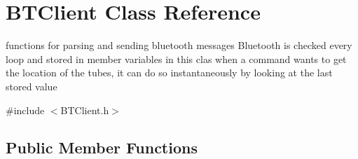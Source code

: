 \hypertarget{classBTClient}{\section{B\-T\-Client Class Reference}
\label{classBTClient}
}


functions for parsing and sending bluetooth messages Bluetooth is checked every loop and stored in member variables in this clas when a command wants to get the location of the tubes, it can do so instantaneously by looking at the last stored value  




{\ttfamily \#include $<$B\-T\-Client.\-h$>$}

\subsection*{Public Member Functions}
